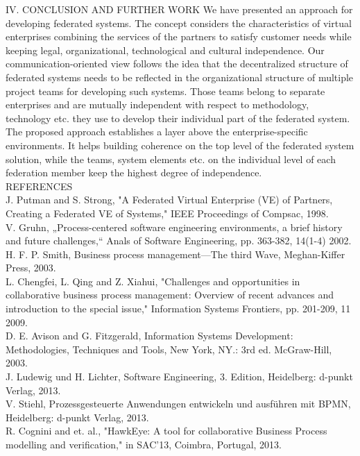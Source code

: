 IV.	CONCLUSION AND FURTHER WORK
We have presented an approach for developing federated systems. The concept considers the characteristics of virtual enterprises combining the services of the partners to satisfy customer needs while keeping legal, organizational, technological and cultural independence.
Our communication-oriented view follows the idea that the decentralized structure of federated systems needs to be reflected in the organizational structure of multiple project teams for developing such systems. Those teams belong to separate enterprises and are mutually independent with respect to methodology, technology etc. they use to develop their individual part of the federated system. 
The proposed approach establishes a layer above the enterprise-specific environments. It helps building coherence on the top level of the federated system solution, while the teams, system elements etc. on the individual level of each federation member keep the highest degree of independence.
\\
REFERENCES
\\
[1] 	J. Putman and S. Strong, "A Federated Virtual Enterprise (VE) of Partners, Creating a Federated VE of Systems," IEEE Proceedings of Compsac, 1998. 
\\
[2] 	V. Gruhn, „Process-centered software engineering environments, a brief history and future challenges,“ Anals of Software Engineering, pp. 363-382, 14(1-4) 2002. 
\\
[3] 	H. F. P. Smith, Business process management—The third Wave, Meghan-Kiffer Press, 2003. 
\\
[4] 	L. Chengfei, L. Qing and Z. Xiahui, "Challenges and opportunities in collaborative business process management: Overview of recent advances and introduction to the special issue," Information Systems Frontiers, pp. 201-209, 11 2009. 
\\
[5] 	D. E. Avison and G. Fitzgerald, Information Systems Development: Methodologies, Techniques and Tools, New York, NY.: 3rd ed. McGraw-Hill, 2003. 
\\
[6] 	J. Ludewig und H. Lichter, Software Engineering, 3. Edition, Heidelberg: d-punkt Verlag, 2013. 
\\
[7] 	V. Stiehl, Prozessgesteuerte Anwendungen entwickeln und ausführen mit BPMN, Heidelberg: d-punkt Verlag, 2013. 
\\
[8] 	R. Cognini and et. al., "HawkEye: A tool for collaborative Business Process modelling and verification," in SAC’13, Coimbra, Portugal, 2013. 
\\
